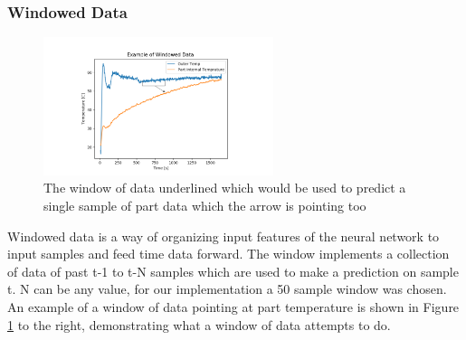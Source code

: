 \subsubsection{Windowed Data}
\begin{figure}
  \vspace{-50pt}
  \begin{center}
    \includegraphics[width=0.6\textwidth]{lstm/window.png}
  \end{center}
  \vspace{-20pt}
  \caption{The window of data underlined which would be used to predict a single sample of part data which the arrow is pointing too}
  \label{fig:windowed}
  \vspace{-50pt}
\end{figure}
Windowed data is a way of organizing input features of the neural network to input samples and feed time data forward. The window implements a collection of data of past t-1 to t-N samples which are used to make a prediction on sample t. N can be any value, for our implementation a 50 sample window was chosen. An example of a window of data pointing at part temperature is shown in Figure \ref{fig:windowed} to the right, demonstrating what a window of data attempts to do. 

\newpage
